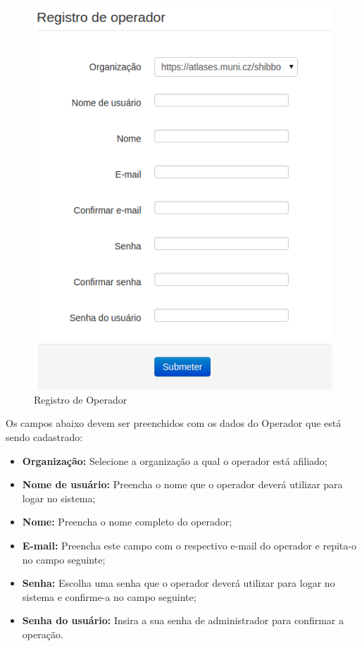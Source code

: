 \begin{figure}[ht]
     \centering
     \includegraphics[scale=0.6]{images/registroop.png}
     \caption{Registro de Operador}
     \label{fig:registroop}
\end{figure}

Os campos abaixo devem ser preenchidos com os dados do Operador que está sendo cadastrado:

\begin{itemize}

	\item \textbf{Organização:} Selecione a organização a qual o operador está afiliado;
	\item \textbf{Nome de usuário:} Preencha o nome que o operador deverá utilizar para logar no sistema;
	\item \textbf{Nome:} Preencha o nome completo do operador;
	\item \textbf{E-mail:} Preencha este campo com o respectivo e-mail do operador e repita-o no campo seguinte;
	\item \textbf{Senha:} Escolha uma senha que o operador deverá utilizar para logar no sistema e confirme-a no campo seguinte;
	\item \textbf{Senha do usuário:} Insira a sua senha de administrador para confirmar a operação.
	
\end{itemize}

